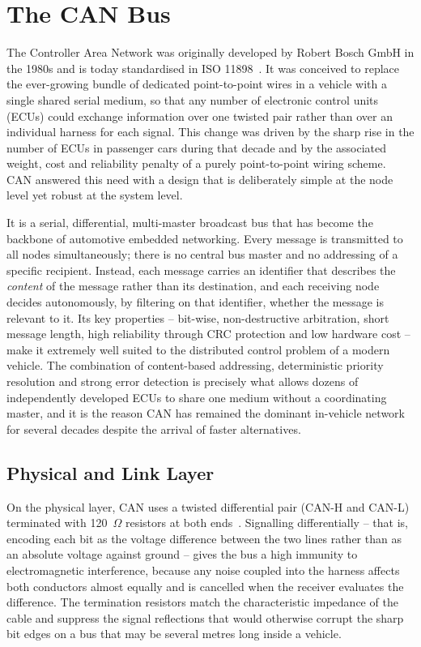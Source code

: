 \documentclass[11pt,a4paper,oneside,parskip=half]{scrreprt}
\begin{document}
\section{The CAN Bus}
\label{sec:can}
The Controller Area Network was originally developed by Robert Bosch GmbH in the 1980s and is today standardised in ISO 11898~\cite{iso11898}. It was conceived to replace the ever-growing bundle of dedicated point-to-point wires in a vehicle with a single shared serial medium, so that any number of electronic control units (ECUs) could exchange information over one twisted pair rather than over an individual harness for each signal. This change was driven by the sharp rise in the number of ECUs in passenger cars during that decade and by the associated weight, cost and reliability penalty of a purely point-to-point wiring scheme. CAN answered this need with a design that is deliberately simple at the node level yet robust at the system level.

It is a serial, differential, multi-master broadcast bus that has become the backbone of automotive embedded networking. Every message is transmitted to all nodes simultaneously; there is no central bus master and no addressing of a specific recipient. Instead, each message carries an identifier that describes the \emph{content} of the message rather than its destination, and each receiving node decides autonomously, by filtering on that identifier, whether the message is relevant to it. Its key properties -- bit-wise, non-destructive arbitration, short message length, high reliability through CRC protection and low hardware cost -- make it extremely well suited to the distributed control problem of a modern vehicle. The combination of content-based addressing, deterministic priority resolution and strong error detection is precisely what allows dozens of independently developed ECUs to share one medium without a coordinating master, and it is the reason CAN has remained the dominant in-vehicle network for several decades despite the arrival of faster alternatives.

\subsection{Physical and Link Layer}
On the physical layer, CAN uses a twisted differential pair (CAN-H and CAN-L) terminated with 120~$\Omega$ resistors at both ends~\cite{iso11898_2}. Signalling differentially -- that is, encoding each bit as the voltage difference between the two lines rather than as an absolute voltage against ground -- gives the bus a high immunity to electromagnetic interference, because any noise coupled into the harness affects both conductors almost equally and is cancelled when the receiver evaluates the difference. The termination resistors match the characteristic impedance of the cable and suppress the signal reflections that would otherwise corrupt the sharp bit edges on a bus that may be several metres long inside a vehicle.
\end{document}
